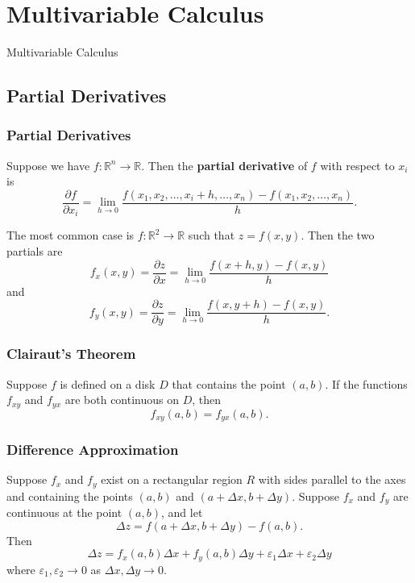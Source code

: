 \documentclass{beamer}
\begin{document}
\section{Multivariable Calculus}
\begin{frame}
\begin{center}
\Huge Multivariable Calculus
\end{center}
\end{frame}


\subsection{Partial Derivatives}

\begin{frame}
\frametitle{Partial Derivatives}
{\small 
\begin{Definition}
Suppose we have $f:\mathbb{R}^n \to \mathbb{R}$. Then the {\bf partial derivative} of $f$ with respect to $x_i$ is
$$
\frac{\partial f}{\partial x_i} = \lim_{h\to 0} \frac{f(x_1, x_2,\ldots, x_i + h,\ldots, x_n) - f(x_1, x_2,\ldots, x_n)}{h}.
$$
\end{Definition}
The most common case is $f:\mathbb{R}^2\to \mathbb{R}$ such that $z = f(x, y)$. Then the two partials are
$$
f_x(x, y) = \frac{\partial z}{\partial x} = \lim_{h\to 0 } \frac{f(x + h, y) - f(x, y)}{h}
$$
and
$$
f_y(x, y) = \frac{\partial z}{\partial y} = \lim_{h\to 0 } \frac{f(x, y + h) - f(x, y)}{h}.
$$

}
\end{frame}

\begin{frame}
\frametitle{Clairaut's Theorem}

\begin{Theorem}[Clairaut]
Suppose $f$ is defined on a disk $D$ that contains the point $(a, b)$. If the functions $f_{xy}$ and $f_{yx}$ are both continuous on $D$, then
$$
f_{xy}(a, b) = f_{yx}(a, b).
$$
\end{Theorem}

\end{frame}

\begin{frame}
\frametitle{Difference Approximation}

\begin{Theorem}
Suppose $f_x$ and $f_y$ exist on a rectangular region $R$ with sides parallel to the axes and containing the points $(a, b)$ and $(a + \Delta x, b + \Delta y)$. Suppose $f_x$ and $f_y$ are continuous at the point $(a, b)$, and let
$$
\Delta z = f(a + \Delta x, b + \Delta y) - f(a, b).
$$
Then
$$
\Delta z = f_x(a, b)\Delta x + f_y(a, b)\Delta y + \varepsilon_1\Delta x + \varepsilon_2\Delta y
$$
where $\varepsilon_1,\varepsilon_2\to 0$ as $\Delta x,\Delta y\to 0$.

\end{Theorem}

\end{frame}
\end{document}
